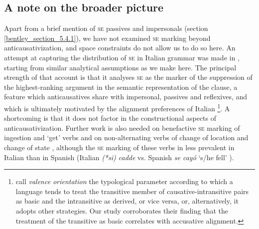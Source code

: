 \documentclass[output=paper,colorlinks,citecolor=brown
]{langscibook}
\begin{document}
\subsection{A note on the broader picture}
\label{bentley_section_5.5}

Apart from a brief mention of \textsc{se} passives and impersonals (section \ref{bentley_section_5.4.1}), we have not examined \textsc{se} marking beyond anticausativization, and space constraints do not allow us to do so here. An attempt at capturing the distribution of \textsc{se} in Italian grammar was made in \citet{bentley2006split}, starting from similar analytical assumptions as we make here. The principal strength of that account is that it analyses \textsc{se} as the marker of the suppression of the highest-ranking argument in the semantic representation of the clause, a feature which anticausatives share with impersonal, passives and reflexives, and which is ultimately motivated by the alignment preferences of Italian \footnote{\citet{nichols2004transitivizing} call \textit{valence orientation} the typological parameter according to which a language tends to treat the transitive member of causative-intransitive pairs as basic and the intransitive as derived, or vice versa, or, alternatively, it adopts other strategies. Our study corroborates their finding that the treatment of the transitive as basic correlates with accusative alignment.}.  A shortcoming is that it does not factor in the constructional aspects of anticausativization. Further work is also needed on benefactive \textsc{se} marking of ingestion and ‘get’ verbs \citep[153—154]{bentley2006split} and on non-alternating verbs of change of location and change of state \citep{miguel2000operador,gonzales2006construcciones,jimenez2017causativity}, although the \textsc{se} marking of these verbs in less prevalent in Italian than in Spanish (Italian \textit{(*si) cadde} vs. Spanish \textit{se cayó} ‘s/he fell’ ). 
\end{document}
